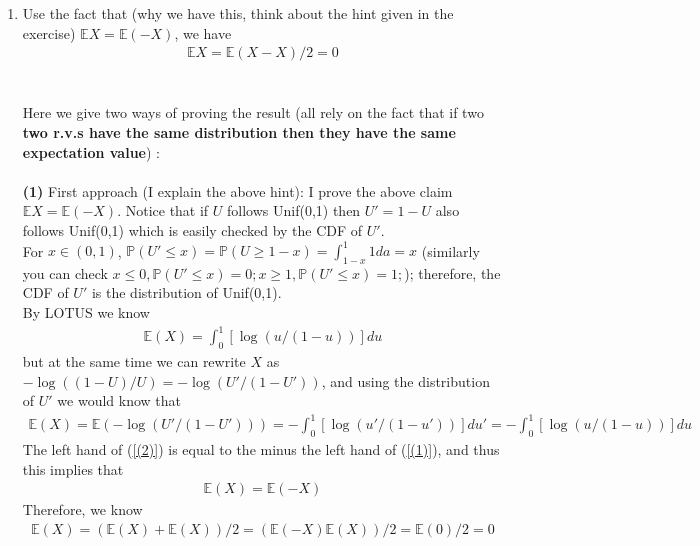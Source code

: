 \begin{exercise}[BH.5.16]
\begin{solution}
\begin{enumerate}
    \item Use the fact that (why we have this, think about the hint given in the exercise) 
    	$\mathbb{E}X = \mathbb{E}(-X)$, we have 
    	\begin{align*}
    		\mathbb{E}X = \mathbb{E}(X -X)/2=0
    	\end{align*}
    	\\~\\
    	Here we give two ways of proving the result (all rely on the fact that if two \textbf{two r.v.s have the same distribution then they have the same expectation value})   :\\~\\
    	\textbf{(1)} First approach (I explain the above hint): I prove the above claim $\mathbb{E}X = \mathbb{E}(-X)$. Notice that if $U$ follows Unif(0,1) then $U'=1-U$ also follows Unif(0,1) which is easily checked by the CDF of $U'$.\\
    	For  $x\in (0,1)$, $\mathbb{P}\left(U' \leq x \right)= \mathbb{P}\left(U \geq 1-x \right)=\int_{1-x}^{1} 1 da= x$ (similarly you can check $x\leq 0, \mathbb{P}\left(U' \leq x \right)=0;x\geq 1, \mathbb{P}\left(U' \leq x \right)=1; $); therefore, the CDF of $U'$  is the distribution of Unif(0,1). 
    	~\\
    	By LOTUS we know 
    	\begin{align}
    		\mathbb{E}\left(X \right)=	\int_{0}^{1} \left[\log\left(u/(1-u) \right)\right] du \label{(1)}
    	\end{align}  
    	but at the same time we can rewrite $X$ as $-\log((1-U)/U)=-\log(U'/(1-U'))$, and using the distribution of $U'$ we would know that 
    	\begin{align}
    		\mathbb{E}\left(X \right)= \mathbb{E} \left(-\log(U'/(1-U'))\right) = - 	\int_{0}^{1} \left[\log\left(u'/(1-u') \right)\right] du'= - 	\int_{0}^{1} \left[\log\left(u/(1-u) \right)\right] du \label{(2)}
    	\end{align}  
    	The left hand of (\ref{(2)})  is equal to the minus the left hand of (\ref{(1)}), and thus this implies that 
    	\begin{align*}
    		\mathbb{E}(X) = \mathbb{E}(-X)
    	\end{align*} 
    	Therefore, we know 
    	\begin{align*}
    		\mathbb{E}(X) = (\mathbb{E}(X)+ 	\mathbb{E}(X))/2 = (\mathbb{E}(-X)	\mathbb{E}(X))/2 = \mathbb{E}(0)/2=0
    	\end{align*}
    	

\end{enumerate}
\end{solution}
\end{exercise}

